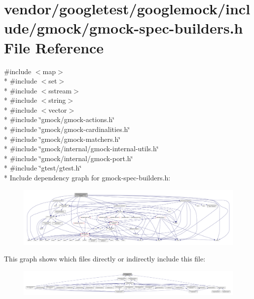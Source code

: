 \hypertarget{gmock-spec-builders_8h}{}\section{vendor/googletest/googlemock/include/gmock/gmock-\/spec-\/builders.h File Reference}
\label{gmock-spec-builders_8h}
{\ttfamily \#include $<$map$>$}\\*
{\ttfamily \#include $<$set$>$}\\*
{\ttfamily \#include $<$sstream$>$}\\*
{\ttfamily \#include $<$string$>$}\\*
{\ttfamily \#include $<$vector$>$}\\*
{\ttfamily \#include \char`\"{}gmock/gmock-\/actions.\+h\char`\"{}}\\*
{\ttfamily \#include \char`\"{}gmock/gmock-\/cardinalities.\+h\char`\"{}}\\*
{\ttfamily \#include \char`\"{}gmock/gmock-\/matchers.\+h\char`\"{}}\\*
{\ttfamily \#include \char`\"{}gmock/internal/gmock-\/internal-\/utils.\+h\char`\"{}}\\*
{\ttfamily \#include \char`\"{}gmock/internal/gmock-\/port.\+h\char`\"{}}\\*
{\ttfamily \#include \char`\"{}gtest/gtest.\+h\char`\"{}}\\*
Include dependency graph for gmock-\/spec-\/builders.h\+:\nopagebreak
\begin{figure}[H]
\begin{center}
\leavevmode
\includegraphics[width=350pt]{gmock-spec-builders_8h__incl}
\end{center}
\end{figure}
This graph shows which files directly or indirectly include this file\+:\nopagebreak
\begin{figure}[H]
\begin{center}
\leavevmode
\includegraphics[width=350pt]{gmock-spec-builders_8h__dep__incl}
\end{center}
\end{figure}
